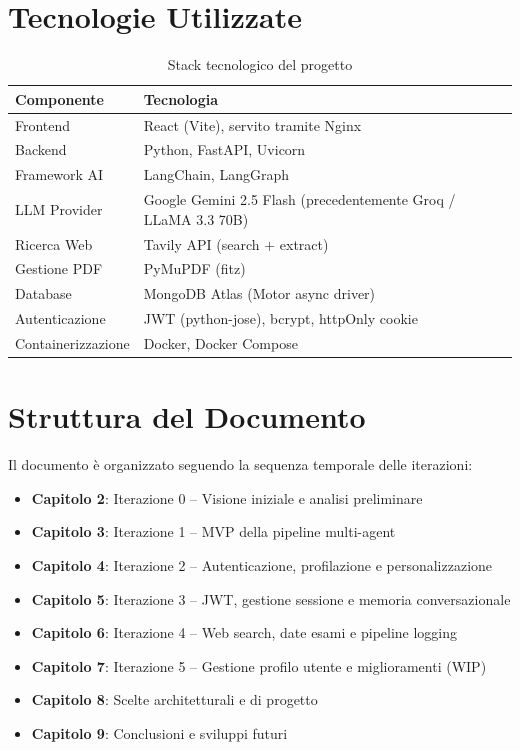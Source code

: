 \documentclass[a4paper,12pt]{report}
\begin{document}
\section{Tecnologie Utilizzate}

\begin{table}[H]
\centering
\begin{tabularx}{\textwidth}{l X}
\toprule
\textbf{Componente} & \textbf{Tecnologia} \\
\midrule
Frontend & React (Vite), servito tramite Nginx \\
Backend & Python, FastAPI, Uvicorn \\
Framework AI & LangChain, LangGraph \\
LLM Provider & Google Gemini 2.5 Flash (precedentemente Groq / LLaMA 3.3 70B) \\
Ricerca Web & Tavily API (search + extract) \\
Gestione PDF & PyMuPDF (fitz) \\
Database & MongoDB Atlas (Motor async driver) \\
Autenticazione & JWT (python-jose), bcrypt, httpOnly cookie \\
Containerizzazione & Docker, Docker Compose \\
\bottomrule
\end{tabularx}
\caption{Stack tecnologico del progetto}
\end{table}

\section{Struttura del Documento}

Il documento è organizzato seguendo la sequenza temporale delle iterazioni:
\begin{itemize}
    \item \textbf{Capitolo 2}: Iterazione 0 -- Visione iniziale e analisi preliminare
    \item \textbf{Capitolo 3}: Iterazione 1 -- MVP della pipeline multi-agent
    \item \textbf{Capitolo 4}: Iterazione 2 -- Autenticazione, profilazione e personalizzazione
    \item \textbf{Capitolo 5}: Iterazione 3 -- JWT, gestione sessione e memoria conversazionale
    \item \textbf{Capitolo 6}: Iterazione 4 -- Web search, date esami e pipeline logging
    \item \textbf{Capitolo 7}: Iterazione 5 -- Gestione profilo utente e miglioramenti (WIP)
    \item \textbf{Capitolo 8}: Scelte architetturali e di progetto
    \item \textbf{Capitolo 9}: Conclusioni e sviluppi futuri
\end{itemize}
\end{document}
